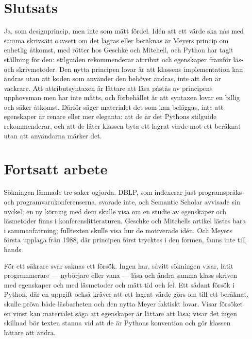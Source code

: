 \section{Slutsats}
\label{sec:egen-slutsats}

Ja, som designprincip, men inte som mätt fördel.  Idén att ett värde
ska nås med samma skrivsätt oavsett om det lagras eller beräknas är
Meyers princip om enhetlig åtkomst\autocite{Meyer1997OOSC}, med rötter
hos Geschke och Mitchell\autocite{GeschkeMitchell1975}, och Python har
tagit ställning för den: stilguiden rekommenderar attribut och
egenskaper framför läs- och skrivmetoder\autocite{pep8}.  Den nytta
principen lovar är att klassens implementation kan ändras utan att koden
som använder den behöver ändras, inte att den är vackrare.  Att
attributsyntaxen är lättare att läsa påstås av principens upphovsman men
har inte mätts, och förbehållet är att syntaxen lovar en billig och
säker åtkomst\autocite{pep8,Cwalina2008Properties}.  Därför säger
materialet det som kan beläggas, inte att egenskaper är renare eller mer
eleganta: att de är det Pythons stilguide rekommenderar, och att de
låter klassen byta ett lagrat värde mot ett beräknat utan att
användarna märker det.

\section{Fortsatt arbete}
\label{sec:egen-fortsatt}

Sökningen lämnade tre saker ogjorda.  DBLP, som indexerar just
programspråks- och programvarukonferenserna, svarade inte, och Semantic
Scholar avvisade sin nyckel; en ny körning med dem skulle visa om en
studie av egenskaper och läsmetoder finns i konferenslitteraturen.
Geschke och Mitchells artikel\autocite{GeschkeMitchell1975} lästes bara i
sammanfattning; fulltexten skulle visa hur de motiverade idén.  Och
Meyers första upplaga från 1988, där principen först trycktes i den
formen, fanns inte till hands.

För ett säkrare svar saknas ett försök.  Ingen har, såvitt sökningen
visar, låtit programmerare --- nybörjare eller vana --- läsa och ändra
samma klass skriven med egenskaper och med läsmetoder och mätt tid och
fel.  Ett sådant försök i Python, där en uppgift också kräver att ett
lagrat värde görs om till ett beräknat, skulle pröva både läsbarheten
och den nytta Meyer faktiskt lovar.  Visar försöket en vinst kan
materialet säga att egenskaper är lättare att läsa; visar det ingen
skillnad bör texten stanna vid att de är Pythons konvention och gör
klassen lättare att ändra.


